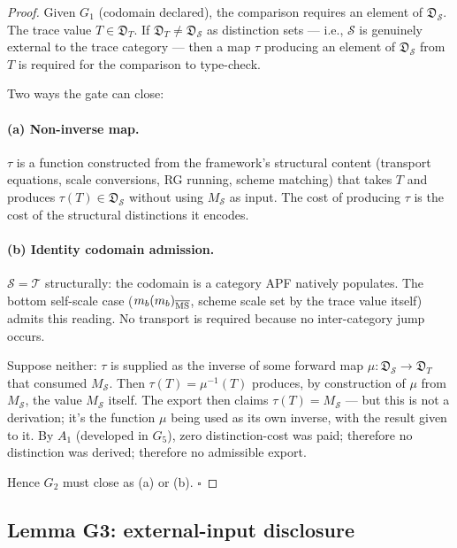 \begin{proof}
Given $G_1$ (codomain declared), the comparison requires an element of $\mathfrak{D}_{\mathcal{S}}$. The trace value $T \in \mathfrak{D}_T$. If $\mathfrak{D}_T \ne \mathfrak{D}_{\mathcal{S}}$ as distinction sets --- i.e., $\mathcal{S}$ is genuinely external to the trace category --- then a map $\tau$ producing an element of $\mathfrak{D}_{\mathcal{S}}$ from $T$ is required for the comparison to type-check.

Two ways the gate can close:

\paragraph{(a) Non-inverse map.} $\tau$ is a function constructed from the framework's structural content (transport equations, scale conversions, RG running, scheme matching) that takes $T$ and produces $\tau(T) \in \mathfrak{D}_{\mathcal{S}}$ without using $M_{\mathcal{S}}$ as input. The cost of producing $\tau$ is the cost of the structural distinctions it encodes.

\paragraph{(b) Identity codomain admission.} $\mathcal{S} = \mathcal{T}$ structurally: the codomain is a category APF natively populates. The bottom self-scale case ($m_b(m_b)_{\overline{\rm MS}}$, scheme scale set by the trace value itself) admits this reading. No transport is required because no inter-category jump occurs.

Suppose neither: $\tau$ is supplied as the inverse of some forward map $\mu: \mathfrak{D}_{\mathcal{S}} \to \mathfrak{D}_T$ that consumed $M_{\mathcal{S}}$. Then $\tau(T) = \mu^{-1}(T)$ produces, by construction of $\mu$ from $M_{\mathcal{S}}$, the value $M_{\mathcal{S}}$ itself. The export then claims $\tau(T) = M_{\mathcal{S}}$ --- but this is not a derivation; it's the function $\mu$ being used as its own inverse, with the result given to it. By $A_1$ (developed in $G_5$), zero distinction-cost was paid; therefore no distinction was derived; therefore no admissible export.

Hence $G_2$ must close as (a) or (b). $\square$
\end{proof}

\subsection{Lemma G3: external-input disclosure}
\label{subsec:lemma-G3}

